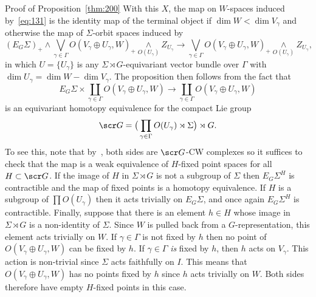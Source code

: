 \documentclass{amsart}
\theoremstyle{definition}
\theoremstyle{remark}
\newenvironment{pf*}[1]{\bigskip{\em #1:\/}}{\qed\medskip}
\newcommand{\smashove}[1]{\underset{#1}{\wedge}}
\newcommand{\eggroup}[2]{E_{#1}#2}
\newcommand{\egsigma}[1]{\eggroup{#1}{\Sigma}}
\begin{document}
\begin{pf*}{Proof of Proposition~\ref{thm:200}}
With this $X$, the map on $W$-spaces induced by~\eqref{eq:131} is the
identity map of the terminal object if $\dim W<\dim V_{\gamma}$ and
otherwise the map of $\Sigma$-orbit spaces induced by
\[
(\egsigma{G})_{+}\wedge \bigvee_{\gamma\in\Gamma}O(V_{\gamma}\oplus
U_{\gamma},W)_{+}\smashove{O(U_{\gamma})}Z_{U_{\gamma}}\to 
\bigvee_{\gamma\in\Gamma}O(V_{\gamma}\oplus U_{\gamma},W)_{+}\smashove{O(U_{\gamma})}Z_{U_{\gamma}},
\]
in which $U=\{U_{\gamma}\}$ is any $\Sigma\rtimes G$-equivariant
vector bundle over $\Gamma$ with $\dim U_{\gamma}= \dim W-\dim
V_{\gamma}$.  The proposition then follows from the fact that
\[
\egsigma{G}\times \coprod_{\gamma\in\Gamma}O(V_{\gamma}\oplus U_{\gamma},W) \to 
\coprod_{\gamma\in\Gamma}O(V_{\gamma}\oplus U_{\gamma},W)
\]
is an equivariant homotopy equivalence for the compact Lie group
\[
\scr G = \big(\prod_{\gamma\in\Gamma}O(U_{\gamma})\rtimes\Sigma\big)\rtimes G.
\]
To see this, note that by~\cite{MR696520,MR0500993}, both sides are
$\scr G$-CW complexes so it suffices to check that the map is a weak
equivalence of $H$-fixed point spaces for all $H\subset \scr G$.  If
the image of $H$ in $\Sigma\rtimes G$ is not a subgroup of $\Sigma$
then $\egsigma{G}^{H}$ is contractible and the map of fixed points is
a homotopy equivalence.  If $H$ is a subgroup of $\prod O(U_{\gamma})$
then it acts trivially on $\egsigma{G}$, and once again
$\egsigma{G}^{H}$ is contractible.  Finally, suppose that there is an
element $h\in H$ whose image in $\Sigma\rtimes G$ is a non-identity of
$\Sigma$.  Since $W$ is pulled back from a $G$-representation, this
element acts trivially on $W$.  If $\gamma \in\Gamma$ is not fixed by
$h$ then no point of $O(V_{\gamma}\oplus U_{\gamma},W)$ can be fixed
by $h$.  If $\gamma\in\Gamma$ {\em is} fixed by $h$, then $h$ acts on
$V_{\gamma}$.  This action is non-trivial since $\Sigma$ acts
faithfully on $I$.  This means that $O(V_{\gamma}\oplus U_{\gamma},W)$
has no points fixed by $h$ since $h$ acts trivially on $W$.  Both
sides therefore have empty $H$-fixed points in this case.
\end{pf*}
\end{document}
